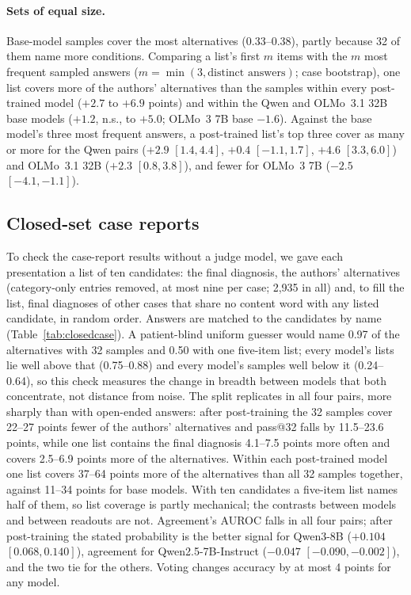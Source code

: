 \documentclass[wcp]{jmlr}
\begin{document}
\paragraph{Sets of equal size.} Base-model samples cover the most alternatives (0.33--0.38), partly because 32 of them name more conditions. Comparing a list's first $m$ items with the $m$ most frequent sampled answers ($m=\min(3,\text{distinct answers})$; case bootstrap), one list covers more of the authors' alternatives than the samples within every post-trained model ($+2.7$ to $+6.9$ points) and within the Qwen and OLMo~3.1 32B base models ($+1.2$, n.s., to $+5.0$; OLMo~3 7B base $-1.6$). Against the base model's three most frequent answers, a post-trained list's top three cover as many or more for the Qwen pairs ($+2.9$ $[1.4,4.4]$, $+0.4$ $[-1.1,1.7]$, $+4.6$ $[3.3,6.0]$) and OLMo~3.1 32B ($+2.3$ $[0.8,3.8]$), and fewer for OLMo~3 7B ($-2.5$ $[-4.1,-1.1]$).

\subsection{Closed-set case reports}\label{sec:closedcase}
To check the case-report results without a judge model, we gave each presentation a list of ten candidates: the final diagnosis, the authors' alternatives (category-only entries removed, at most nine per case; 2,935 in all) and, to fill the list, final diagnoses of other cases that share no content word with any listed candidate, in random order. Answers are matched to the candidates by name (Table~\ref{tab:closedcase}). A patient-blind uniform guesser would name 0.97 of the alternatives with 32 samples and 0.50 with one five-item list; every model's lists lie well above that (0.75--0.88) and every model's samples well below it (0.24--0.64), so this check measures the change in breadth between models that both concentrate, not distance from noise. The split replicates in all four pairs, more sharply than with open-ended answers: after post-training the 32 samples cover 22--27 points fewer of the authors' alternatives and pass@32 falls by 11.5--23.6 points, while one list contains the final diagnosis 4.1--7.5 points more often and covers 2.5--6.9 points more of the alternatives. Within each post-trained model one list covers 37--64 points more of the alternatives than all 32 samples together, against 11--34 points for base models. With ten candidates a five-item list names half of them, so list coverage is partly mechanical; the contrasts between models and between readouts are not. Agreement's AUROC falls in all four pairs; after post-training the stated probability is the better signal for Qwen3-8B ($+0.104$ $[0.068,0.140]$), agreement for Qwen2.5-7B-Instruct ($-0.047$ $[-0.090,-0.002]$), and the two tie for the others. Voting changes accuracy by at most 4 points for any model.
\end{document}
